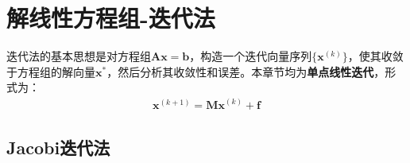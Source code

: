 




% 

\chapter{解线性方程组-迭代法}
迭代法的基本思想是对方程组$\boldsymbol{Ax}=\boldsymbol{b}$，构造一个迭代向量序列$\{\boldsymbol{x}^{(k)}\}$，使其收敛于方程组的解向量$\boldsymbol{x}^\ast$，然后分析其收敛性和误差。本章节均为\textbf{单点线性迭代}，形式为：
\begin{align}
    \boldsymbol{x}^{(k+1)} = \boldsymbol{Mx}^{(k)} + \boldsymbol{f}
\end{align}


\section{Jacobi迭代法}
